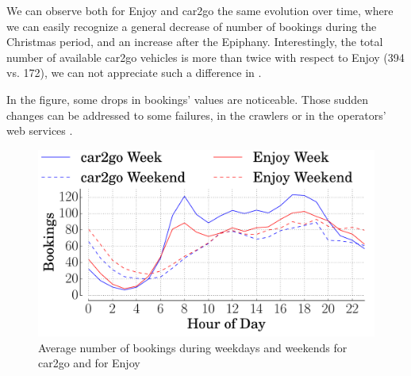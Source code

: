 


We can observe both for Enjoy and car2go the same evolution over time, where we can easily recognize a general decrease of number of bookings during the Christmas period, and an increase after the Epiphany.
Interestingly,  the total number of available car2go vehicles is more than twice with respect to Enjoy (394 vs. 172), we can not appreciate such a difference in . 

 
In the figure, some drops in bookings' values are noticeable. Those sudden changes can be addressed to some failures, in the crawlers  or in the operators' web services .




\begin{figure}
\centering
 \includegraphics[width=0.85\columnwidth]{figures/bookings_day.pdf}
 \caption{Average number of bookings during weekdays and weekends for car2go and for Enjoy\label{fig:bookingsweek}}
\end{figure}

